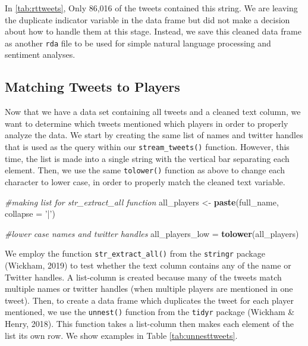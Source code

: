 \documentclass[12pt,twoside]{reedthesis}
\newenvironment{Shaded}{\begin{snugshade}}{\end{snugshade}}
\newcommand{\KeywordTok}[1]{\textcolor[rgb]{0.13,0.29,0.53}{\textbf{#1}}}
\newcommand{\DataTypeTok}[1]{\textcolor[rgb]{0.13,0.29,0.53}{#1}}
\newcommand{\StringTok}[1]{\textcolor[rgb]{0.31,0.60,0.02}{#1}}
\newcommand{\CommentTok}[1]{\textcolor[rgb]{0.56,0.35,0.01}{\textit{#1}}}
\newcommand{\NormalTok}[1]{#1}
\begin{document}
In \ref{tab:rttweets}, Only 86,016 of the tweets contained this string.
We are leaving the duplicate indicator variable in the data frame but
did not make a decision about how to handle them at this stage. Instead,
we save this cleaned data frame as another \texttt{rda} file to be used
for simple natural language processing and sentiment analyses.

\subsection{Matching Tweets to
Players}\label{matching-tweets-to-players}

Now that we have a data set containing all tweets and a cleaned text
column, we want to determine which tweets mentioned which players in
order to properly analyze the data. We start by creating the same list
of names and twitter handles that is used as the query within our
\texttt{stream\_tweets()} function. However, this time, the list is made
into a single string with the vertical bar separating each element.
Then, we use the same \texttt{tolower()} function as above to change
each character to lower case, in order to properly match the cleaned
text variable.

\small
\begin{Shaded}
\begin{Highlighting}[]
\CommentTok{#making list for str_extract_all function}
\NormalTok{all_players <-}\StringTok{ }\KeywordTok{paste}\NormalTok{(full_name, }\DataTypeTok{collapse =} \StringTok{'|'}\NormalTok{)}

\CommentTok{#lower case names and twitter handles}
\NormalTok{all_players_low =}\StringTok{ }\KeywordTok{tolower}\NormalTok{(all_players)}
\end{Highlighting}
\end{Shaded}
\normalsize

We employ the function \texttt{str\_extract\_all()} from the
\texttt{stringr} package (Wickham, 2019) to test whether the text column
contains any of the name or Twitter handles. A list-column is created
because many of the tweets match multiple names or twitter handles (when
multiple players are mentioned in one tweet). Then, to create a data
frame which duplicates the tweet for each player mentioned, we use the
\texttt{unnest()} function from the \texttt{tidyr} package (Wickham \&
Henry, 2018). This function takes a list-column then makes each element
of the list its own row. We show examples in Table
\ref{tab:unnesttweets}.
\end{document}
